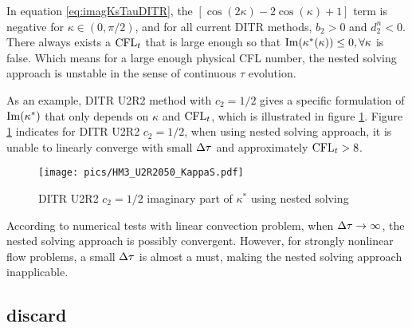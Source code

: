 \documentclass[preprint,12pt]{elsarticle}
\begin{document}
In equation \eqref{eq:imagKsTauDITR},
the $\left[\cos(2\kappa) -2\cos(\kappa) + 1\right]$ term
is negative for $\kappa \in (0, \pi/2)$, and for
all current DITR methods, $b_2>0$ and $d_2^n < 0$.
There always exists a $\text{CFL}_t$ that is large enough
so that $\mathrm{Im}(\kappa^*(\kappa)) \leq 0, \forall \kappa$ is false.
Which means for a large enough physical CFL number, the nested
solving approach is unstable in the sense of continuous $\tau$
evolution. 

As an example, DITR U2R2 method with $c_2=1/2$ gives
a specific formulation of $\mathrm{Im}(\kappa^*)$ that only depends on $\kappa$
and $\text{CFL}_t$, which is illustrated in figure \ref{fig:HM3_U2R2050_KappaS}.
Figure \ref{fig:HM3_U2R2050_KappaS} indicates for DITR U2R2 $c_2=1/2$,
when using nested solving approach, it is unable to linearly converge
with small $\mathrm\Delta \tau$ and approximately $\text{CFL}_t > 8$. 

\begin{figure}[htbp]
    \centering
    \texttt{[image: pics/HM3\_U2R2050\_KappaS.pdf]}
    \caption[]{DITR U2R2 $c_2=1/2$ imaginary part of $\kappa^*$ using 
    nested solving}
    \label{fig:HM3_U2R2050_KappaS}
\end{figure}

According to numerical tests with linear convection problem,
when $\mathrm\Delta \tau \rightarrow \infty$, the nested solving 
approach is possibly convergent. However, for strongly nonlinear
flow problems, a small $\mathrm\Delta \tau$ is almost a must, making 
the nested solving approach inapplicable.


\subsection{discard}
\end{document}
